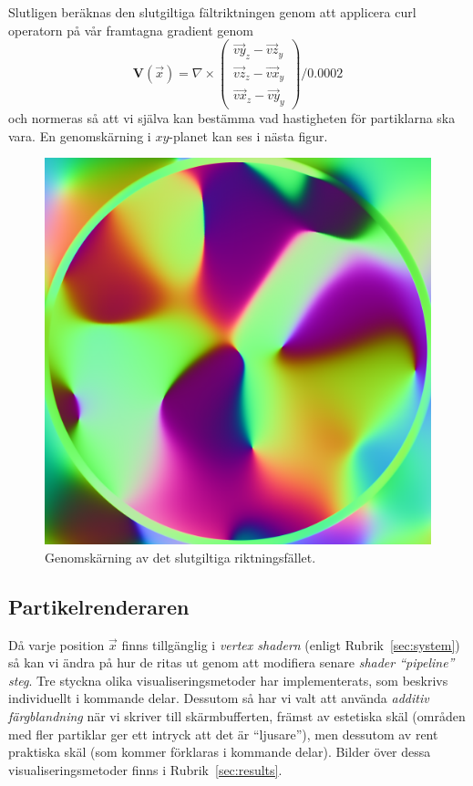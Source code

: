 \documentclass[a4paper]{article}
\begin{document}
\begin{multicols}{2}
Slutligen beräknas den slutgiltiga fältriktningen genom att applicera curl operatorn på vår framtagna gradient genom
\begin{equation}
 \mathbf{V}(\vec{x}) =
 \nabla \times \begin{pmatrix}
\vec{vy}_z - \vec{vz}_y
\\ 
\vec{vz}_z - \vec{vx}_y
\\ 
\vec{vx}_z - \vec{vy}_y
\end{pmatrix} / 0.0002
\end{equation}
och normeras så att vi själva kan bestämma vad hastigheten för partiklarna ska vara. En genomskärning i $xy$-planet kan ses i nästa figur.
\begin{figure}[H]
\center
\begin{minipage}[]{0.3\textwidth}
\includegraphics[width=\textwidth]{share/Curl_downscale.png}
\caption{Genomskärning av det slutgiltiga riktningsfället.}
\end{minipage}
\end{figure}

\subsection{Partikelrenderaren} \label{sec:partikelrenderaren}

Då varje position \(\vec{x}\) finns tillgänglig i \emph{vertex shadern} (enligt Rubrik~\ref{sec:system}) så kan vi ändra på hur de ritas ut genom att modifiera senare \emph{shader ``pipeline'' steg}. Tre styckna olika visualiseringsmetoder har implementerats, som beskrivs individuellt i kommande delar. Dessutom så har vi valt att använda \emph{additiv färgblandning} när vi skriver till skärmbufferten, främst av estetiska skäl (områden med fler partiklar ger ett intryck att det är ``ljusare''), men dessutom av rent praktiska skäl (som kommer förklaras i kommande delar). Bilder över dessa visualiseringsmetoder finns i Rubrik~\ref{sec:results}.


\end{multicols}
\end{document}
